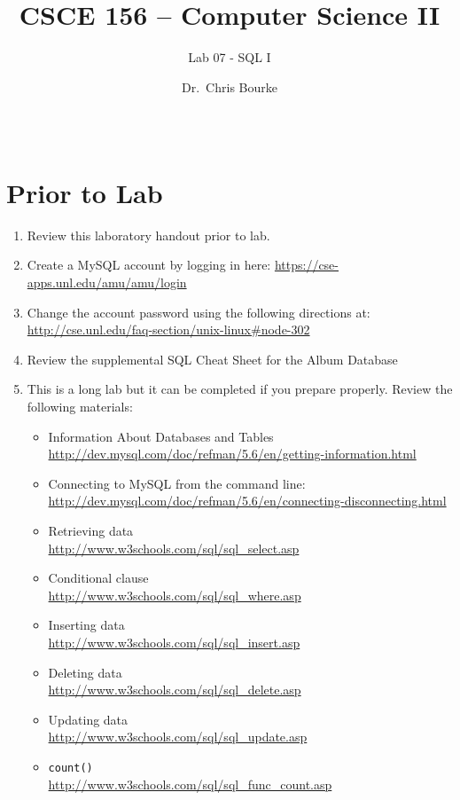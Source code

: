 \documentclass[12pt]{scrartcl}
\title{CSCE 156 -- Computer Science II}
\subtitle{Lab 07 - SQL I}
\author{Dr.\ Chris Bourke}
\date{~}
\begin{document}
\maketitle

\section*{Prior to Lab}

\begin{enumerate}
  \item Review this laboratory handout prior to lab.
  \item Create a MySQL account by logging in here: \url{https://cse-apps.unl.edu/amu/amu/login}
  \item Change the account password using the following directions at: 
  	\url{http://cse.unl.edu/faq-section/unix-linux#node-302}
  \item Review the supplemental SQL Cheat Sheet for the Album Database
  \item This is a long lab but it can be completed if you prepare 
	properly.  Review the following materials:
  \begin{itemize}
    \item Information About Databases and Tables \\
    \url{http://dev.mysql.com/doc/refman/5.6/en/getting-information.html}
    \item Connecting to MySQL from the command line: \\ 
    \url{http://dev.mysql.com/doc/refman/5.6/en/connecting-disconnecting.html}
    \item Retrieving data\\ \url{http://www.w3schools.com/sql/sql_select.asp}
    \item Conditional clause	\\ \url{http://www.w3schools.com/sql/sql_where.asp} 
    \item Inserting data	\\ \url{http://www.w3schools.com/sql/sql_insert.asp} 
    \item Deleting data	\\ 
    \url{http://www.w3schools.com/sql/sql_delete.asp} 
    \item Updating data	\\ 
    \url{http://www.w3schools.com/sql/sql_update.asp} 
    \item \texttt{count()}	\\ 
    \url{http://www.w3schools.com/sql/sql_func_count.asp}

\end{itemize}
\end{enumerate}
\end{document}
